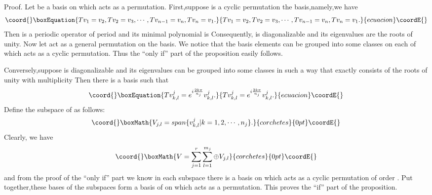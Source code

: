 \documentclass[a4paper,12pt]{article}
\begin{document}
Proof. Let \coordHE{} be a basis on which \coordHE{} acts as a
permutation. First,suppose \coordHE{} is a cyclic permutation the basis,namely,we
have
\begin{equation}\coord{}\boxEquation{
Tv_1=v_2,Tv_2=v_3,\cdots ,Tv_{n-1}=v_n,Tv_n=v_1.
}{
Tv_1=v_2,Tv_2=v_3,\cdots ,Tv_{n-1}=v_n,Tv_n=v_1.
}{ecuacion}\coordE{}\end{equation}
Then \coordHE{} is a periodic operator of period \coordHE{}and its minimal polynomial is \coordHE{}Consequently, \coordHE{} is diagonalizable and its eigenvalues are \coordHE{}  \coordHE{}the \coordHE{} roots of unity. Now let \coordHE{} act as a general permutation on the basis. We notice that the basis
elements can be grouped into some classes on each of which \coordHE{} acts as a
cyclic permutation. Thus the ``only if'' part of the proposition easily
follows.

Conversely,suppose \coordHE{} is diagonalizable and its eigenvalues can be grouped
into some classes \coordHE{} in
such a way that \coordHE{} exactly consists of the \coordHE{}  \coordHE{} roots of unity with multiplicity \coordHE{}Then there is a basis \coordHE{} such that
\begin{equation}\coord{}\boxEquation{
Tv_{k,l}^j=e^{i\frac{2k\pi }{n_j}}v_{k,l}^j.
}{
Tv_{k,l}^j=e^{i\frac{2k\pi }{n_j}}v_{k,l}^j.
}{ecuacion}\coordE{}\end{equation}
Define the subspace \coordHE{} of \coordHE{} as follows:
\[\coord{}\boxMath{
V_{j,l}=span\{v_{k,l}^j|k=1,2,\cdots ,n_j\}.
}{corchetes}{0pt}\coordE{}\]
Clearly, we have
\[\coord{}\boxMath{
V=\sum_{j=1}^r\sum_{l=1}^{m_j}\oplus V_{j,l}
}{corchetes}{0pt}\coordE{}\]
and from the proof of the ``only if'' part we know in each subspace \coordHE{}
there is a basis on which \coordHE{} acts as a cyclic permutation of order \coordHE{}.
Put together,these bases of the subspaces form a basis of \coordHE{} on which \coordHE{}
acts as a permutation. This proves the ``if'' part of the proposition.
\end{document}
